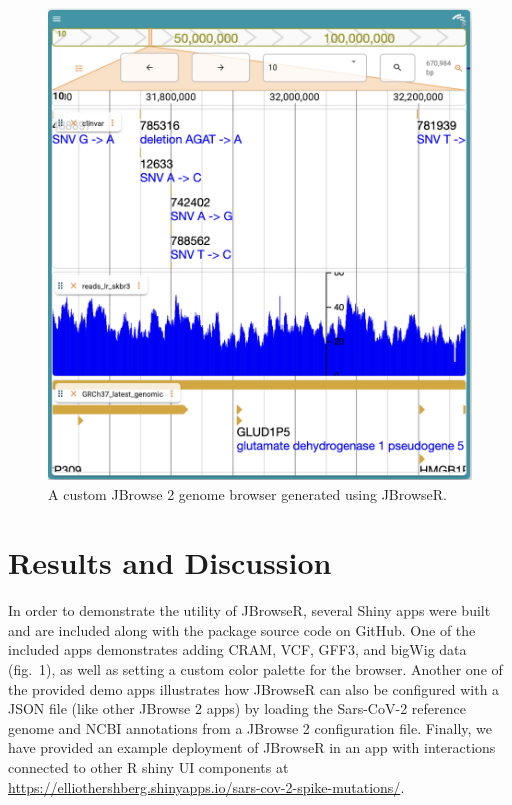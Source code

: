 \documentclass{bioinfo}
\begin{document}
\begin{figure}
\includegraphics[width=1\linewidth]{JBrowseR-paper-fig1} \caption{A custom JBrowse 2 genome browser generated using JBrowseR.}\label{fig:unnamed-chunk-1}
\end{figure}

\section{Results and Discussion}

In order to demonstrate the utility of JBrowseR, several Shiny apps were
built and are included along with the package source code on GitHub. One
of the included apps demonstrates adding CRAM, VCF, GFF3, and bigWig
data (fig.~1), as well as setting a custom color palette for the
browser. Another one of the provided demo apps illustrates how JBrowseR
can also be configured with a JSON file (like other JBrowse 2 apps) by
loading the Sars-CoV-2 reference genome and NCBI annotations from a
JBrowse 2 configuration file. Finally, we have provided an example
deployment of JBrowseR in an app with interactions connected to other R
shiny UI components at
\href{https://elliothershberg.shinyapps.io/sars-cov-2-spike-mutations/}{https://elliothershberg.shinyapps.io/sars-cov-2-spike-mutations/}.
\end{document}
